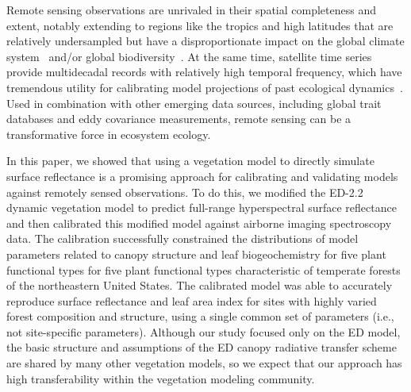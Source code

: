 \conclusions  %

Remote sensing observations are unrivaled in their spatial completeness and extent, notably extending to regions like the tropics and high latitudes that are relatively undersampled but have a disproportionate impact on the global climate system~\citep{schimel2015observing} and/or global biodiversity~\citep{jetz_2016_monitoring}.
At the same time, satellite time series provide multidecadal records with relatively high temporal frequency, which have tremendous utility for calibrating model projections of past ecological dynamics~\citep{kennedy2014bringing, pasquarella2016imagery}.
Used in combination with other emerging data sources, including global trait databases and eddy covariance measurements, remote sensing can be a transformative force in ecosystem ecology.

In this paper, we showed that using a vegetation model to directly simulate surface reflectance is a promising approach for calibrating and validating models against remotely sensed observations.
To do this, we modified the ED-2.2 dynamic vegetation model to predict full-range hyperspectral surface reflectance and then calibrated this modified model against airborne imaging spectroscopy data.
The calibration successfully constrained the distributions of model parameters related to canopy structure and leaf biogeochemistry for five plant functional types for five plant functional types characteristic of temperate forests of the northeastern United States.
The calibrated model was able to accurately reproduce surface reflectance and leaf area index for sites with highly varied forest composition and structure, using a single common set of parameters (i.e., not site-specific parameters).
Although our study focused only on the ED model, the basic structure and assumptions of the ED canopy radiative transfer scheme are shared by many other vegetation models, so we expect that our approach has high transferability within the vegetation modeling community.
